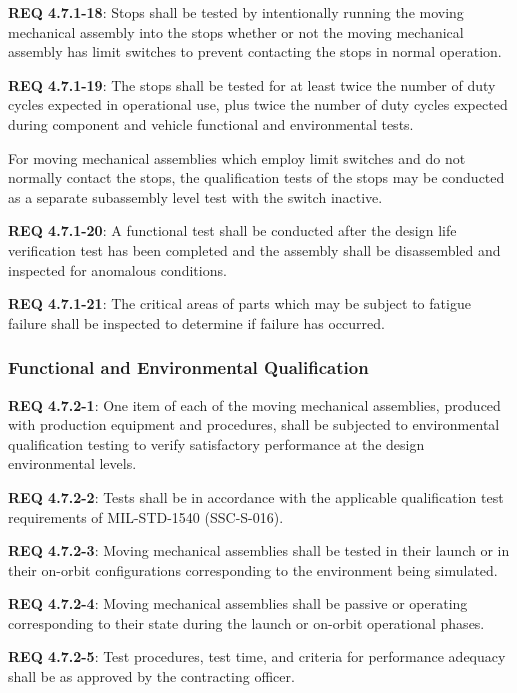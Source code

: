\documentclass[12pt]{article}
\begin{document}
\noindent \textbf{REQ 4.7.1-18}: Stops shall be tested by intentionally running the moving mechanical assembly into the stops whether or not the moving mechanical assembly has limit switches to prevent contacting the stops in normal operation. 

\noindent \textbf{REQ 4.7.1-19}: The stops shall be tested for at least twice the number of duty cycles expected in operational use, plus twice the number of duty cycles expected during component and vehicle functional and environmental tests. 

For moving mechanical assemblies which employ limit switches and do not normally contact the stops, the qualification tests of the stops may be conducted as a separate subassembly level test with the switch inactive. 

\noindent \textbf{REQ 4.7.1-20}: A functional test shall be conducted after the design life verification test has been completed and the assembly shall be disassembled and inspected for anomalous conditions. 

\noindent \textbf{REQ 4.7.1-21}: The critical areas of parts which may be subject to fatigue failure shall be inspected to determine if failure has occurred.


\subsubsection{Functional and Environmental Qualification} %
\noindent \textbf{REQ 4.7.2-1}: One item of each of the moving mechanical assemblies, produced with production equipment and procedures, shall be subjected to environmental qualification testing to verify satisfactory performance at the design environmental levels. 

\noindent \textbf{REQ 4.7.2-2}: Tests shall be in accordance with the applicable qualification test requirements of MIL-STD-1540 (SSC-S-016). 

\noindent \textbf{REQ 4.7.2-3}: Moving mechanical assemblies shall be tested in their launch or in their on-orbit configurations corresponding to the environment being simulated. 

\noindent \textbf{REQ 4.7.2-4}: Moving mechanical assemblies shall be passive or operating corresponding to their state during the launch or on-orbit operational phases. 

\noindent \textbf{REQ 4.7.2-5}: Test procedures, test time, and criteria for performance adequacy shall be as approved by the contracting officer. 
\end{document}
